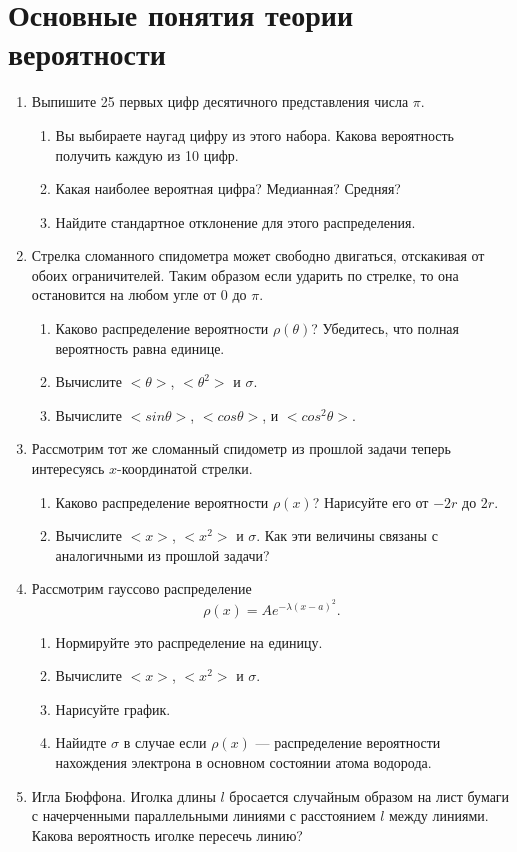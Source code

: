 \documentclass[a4paper]{article}
\begin{document}
\section*{Основные понятия теории вероятности}

\begin{enumerate}

\item Выпишите 25 первых цифр десятичного представления числа $\pi$.
\begin{enumerate}
    \item Вы выбираете наугад цифру из этого набора. Какова вероятность получить каждую из 10 цифр.
    \item Какая наиболее вероятная цифра? Медианная? Средняя?
    \item Найдите стандартное отклонение для этого распределения.
\end{enumerate}

\item Стрелка сломанного спидометра может свободно двигаться, отскакивая от обоих ограничителей. Таким образом если ударить по стрелке, то она остановится на любом угле от 0 до $\pi$.
\begin{enumerate}
    \item Каково распределение вероятности $\rho(\theta)$? Убедитесь, что полная вероятность равна единице.
    \item Вычислите $<\theta>$, $<\theta^2>$ и $\sigma$.
    \item Вычислите $<sin \theta>$, $<cos \theta>$, и $<cos^2\theta>$.
\end{enumerate}

\item Рассмотрим тот же сломанный спидометр из прошлой задачи теперь интересуясь $x$-координатой стрелки.
\begin{enumerate}
    \item Каково распределение вероятности $\rho(x)$? Нарисуйте его от $-2r$ до $2r$.
    \item Вычислите $<x>$, $<x^2>$ и $\sigma$. Как эти величины связаны с аналогичными из прошлой задачи?
\end{enumerate}

\item Рассмотрим гауссово распределение
\begin{equation*}
\rho(x) = A e^{- \lambda (x-a)^2}.
\end{equation*}
\begin{enumerate}
    \item Нормируйте это распределение на единицу.
    \item Вычислите $<x>$, $<x^2>$ и $\sigma$.
    \item Нарисуйте график.
    \item Найидте $\sigma$ в случае если $\rho(x)$ — распределение вероятности нахождения электрона в основном состоянии атома водорода.
\end{enumerate}

\item Игла Бюффона. Иголка длины $l$ бросается случайным образом на лист бумаги с начерченными параллельными линиями с расстоянием $l$ между линиями. Какова вероятность иголке пересечь линию?

\end{enumerate}
\end{document}

